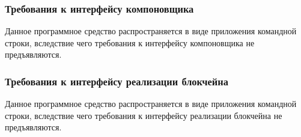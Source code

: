 \subsubsection{Требования к интерфейсу компоновщика}
Данное программное средство распространяется в виде приложения командной
строки, вследствие чего требования к интерфейсу компоновщика не предъявляются.

\subsubsection{Требования к интерфейсу реализации блокчейна}
Данное программное средство распространяется в виде приложения командной
строки, вследствие чего требования к интерфейсу реализации блокчейна не
предъявляются.


